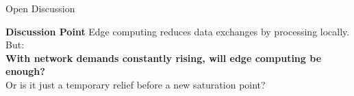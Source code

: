 \documentclass{beamer}
\begin{document}
\begin{frame}{Open Discussion}
  \begin{block}{\textbf{Discussion Point}}
    Edge computing reduces data exchanges by processing locally. But:\\
    \textbf{With network demands constantly rising, will edge computing be enough?}\\
    Or is it just a temporary relief before a new saturation point?
  \end{block}
\end{frame}
\end{document}
